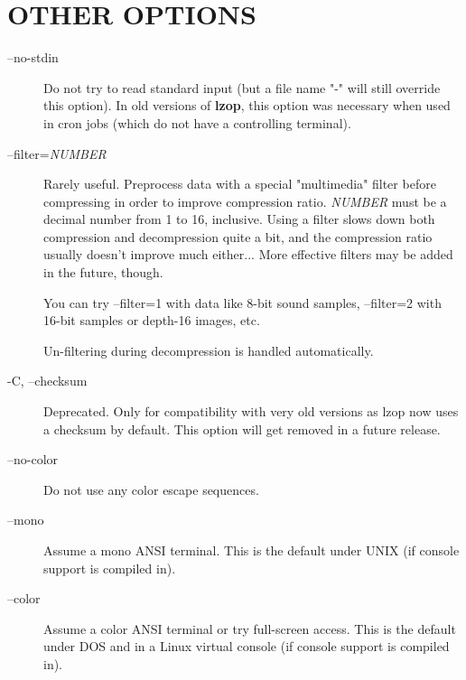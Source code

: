 \section{OTHER OPTIONS\label{OTHER_OPTIONS}}
\begin{description}

\item[{--no-stdin}] \mbox{}

Do not try to read standard input (but a file name "-" will
still override this option).
In old versions of \textbf{lzop}, this option was necessary when
used in cron jobs (which do not have a controlling terminal).


\item[{--filter=\textit{NUMBER}}] \mbox{}

Rarely useful.
Preprocess data with a special "multimedia" filter
before compressing in order to improve compression ratio.
\textit{NUMBER} must be a decimal number from 1 to 16, inclusive.
Using a filter slows down both compression and decompression
quite a bit, and the compression ratio usually doesn't improve
much either...
More effective filters may be added in the future, though.



You can try --filter=1 with data like 8-bit sound samples,
--filter=2 with 16-bit samples or depth-16 images, etc.



Un-filtering during decompression is handled automatically.


\item[{-C, --checksum}] \mbox{}

Deprecated. Only for compatibility with very old versions
as lzop now uses a checksum by default. This option will
get removed in a future release.


\item[{--no-color}] \mbox{}

Do not use any color escape sequences.


\item[{--mono}] \mbox{}

Assume a mono ANSI terminal. This is the default under UNIX
(if console support is compiled in).


\item[{--color}] \mbox{}

Assume a color ANSI terminal or try full-screen access. This
is the default under DOS and in a Linux virtual console
(if console support is compiled in).

\end{description}
